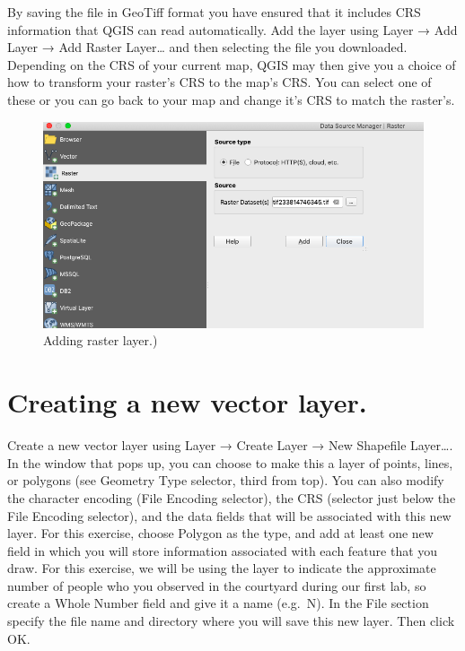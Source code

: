 \documentclass[]{book}
\begin{document}
By saving the file in GeoTiff format you have ensured that it includes CRS information that QGIS can read automatically. Add the layer using Layer → Add Layer → Add Raster Layer\ldots{} and then selecting the file you downloaded. Depending on the CRS of your current map, QGIS may then give you a choice of how to transform your raster's CRS to the map's CRS. You can select one of these or you can go back to your map and change it's CRS to match the raster's.

\begin{figure}
\centering
\includegraphics{images/adding_raster_layer.png}
\caption{Adding raster layer.)}
\end{figure}

\hypertarget{creating-a-new-vector-layer.}{%
\section{Creating a new vector layer.}\label{creating-a-new-vector-layer.}}

Create a new vector layer using Layer → Create Layer → New Shapefile Layer\ldots{}. In the window that pops up, you can choose to make this a layer of points, lines, or polygons (see Geometry Type selector, third from top). You can also modify the character encoding (File Encoding selector), the CRS (selector just below the File Encoding selector), and the data fields that will be associated with this new layer.
For this exercise, choose Polygon as the type, and add at least one new field in which you will store information associated with each feature that you draw. For this exercise, we will be using the layer to indicate the approximate number of people who you observed in the courtyard during our first lab, so create a Whole Number field and give it a name (e.g.~N). In the File section specify the file name and directory where you will save this new layer. Then click OK.
\end{document}

